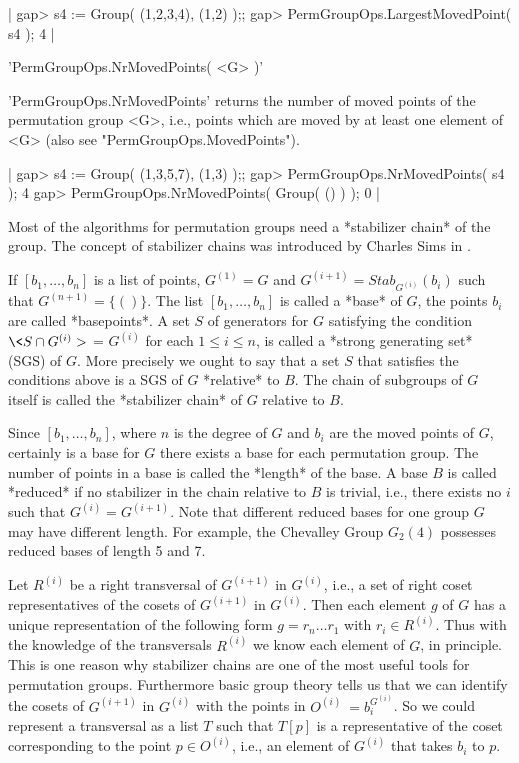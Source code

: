 |    gap> s4 := Group( (1,2,3,4), (1,2) );;
    gap> PermGroupOps.LargestMovedPoint( s4 );
    4 |


'PermGroupOps.NrMovedPoints( <G> )'

'PermGroupOps.NrMovedPoints'  returns  the number of moved points  of the
permutation  group <G>,  i.e.,  points  which are moved by  at  least one
element of <G> (also see "PermGroupOps.MovedPoints").

|    gap> s4 := Group( (1,3,5,7), (1,3) );;
    gap> PermGroupOps.NrMovedPoints( s4 );
    4
    gap> PermGroupOps.NrMovedPoints( Group( () ) );
    0 |


Most of  the algorithms for permutation groups  need a *stabilizer chain*
of the group.  The concept of stabilizer chains was introduced by Charles
Sims in \cite{Sim70}.

If $[b_1, \ldots, b_n]$ is a list of points, $G^{(1)} = G$ and $G^{(i+1)}
= Stab_{G^{(i)}}(b_i)$ such that $G^{(n+1)} = \{ () \}$.  The list $[b_1,
\ldots, b_n]$ is  called a *base*  of $G$,  the points  $b_i$ are  called
*basepoints*.   A  set $S$ of generators for $G$ satisfying the condition
$\< S \cap G^{(i)} >$ = $G^{(i)}$ for each $1 \leq i \leq n$, is called a
*strong  generating set*  (SGS)  of $G$.  More  precisely we ought to say
that  a  set $S$  that satisfies the  conditions  above is a  SGS  of $G$
*relative*  to $B$.   The chain  of subgroups of $G$ itself is called the
*stabilizer chain* of $G$ relative to $B$.

Since $[b_1, \ldots, b_n]$, where $n$ is the degree of $G$ and  $b_i$ are
the moved  points of $G$, certainly is a base for $G$ there exists a base
for each permutation group.  The number of points in a base is called the
*length* of the base.  A base $B$ is called *reduced* if no stabilizer in
the chain relative to $B$ is trivial, i.e., there exists no $i$ such that
$G^{(i)} = G^{(i+1)}$.   Note that  different reduced bases for one group
$G$  may  have  different  length.   For  example,  the  Chevalley  Group
$G_2(4)$ possesses reduced bases of length 5 and 7.

Let $R^{(i)}$ be a right transversal of $G^{(i+1)}$ in $G^{(i)}$, i.e., a
set  of  right  coset representatives of the  cosets  of  $G^{(i+1)}$  in
$G^{(i)}$.  Then each  element $g$ of $G$ has a unique  representation of
the following form $g = r_n  \ldots r_1$ with  $r_i \in  R^{(i)}$.   Thus
with the knowledge of  the transversals $R^{(i)}$ we know each element of
$G$, in principle.  This is one  reason  why stabilizer chains are one of
the most  useful tools for permutation  groups.  Furthermore  basic group
theory  tells us  that  we  can  identify  the  cosets of  $G^{(i+1)}$ in
$G^{(i)}$ with the points  in $O^{(i)} \:=  b_i^{G^{(i)}}$.   So we could
represent  a  transversal   as  a  list  $T$  such   that  $T[p]$  is   a
representative of  the coset  corresponding to the point $p \in O^{(i)}$,
i.e., an element of $G^{(i)}$ that takes $b_i$ to $p$.

